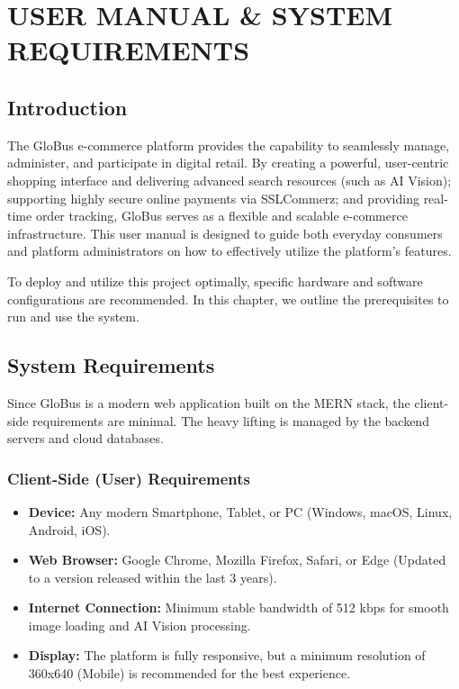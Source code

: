 \chapter{USER MANUAL \& SYSTEM REQUIREMENTS}
\section{Introduction}
The GloBus e-commerce platform provides the capability to seamlessly manage, administer, and participate in digital retail. By creating a powerful, user-centric shopping interface and delivering advanced search resources (such as AI Vision); supporting highly secure online payments via SSLCommerz; and providing real-time order tracking, GloBus serves as a flexible and scalable e-commerce infrastructure. This user manual is designed to guide both everyday consumers and platform administrators on how to effectively utilize the platform's features.

To deploy and utilize this project optimally, specific hardware and software configurations are recommended. In this chapter, we outline the prerequisites to run and use the system.

\section{System Requirements}
Since GloBus is a modern web application built on the MERN stack, the client-side requirements are minimal. The heavy lifting is managed by the backend servers and cloud databases.

\subsection{Client-Side (User) Requirements}
\begin{itemize}
    \item \textbf{Device:} Any modern Smartphone, Tablet, or PC (Windows, macOS, Linux, Android, iOS).
    \item \textbf{Web Browser:} Google Chrome, Mozilla Firefox, Safari, or Edge (Updated to a version released within the last 3 years).
    \item \textbf{Internet Connection:} Minimum stable bandwidth of 512 kbps for smooth image loading and AI Vision processing.
    \item \textbf{Display:} The platform is fully responsive, but a minimum resolution of 360x640 (Mobile) is recommended for the best experience.
\end{itemize}

